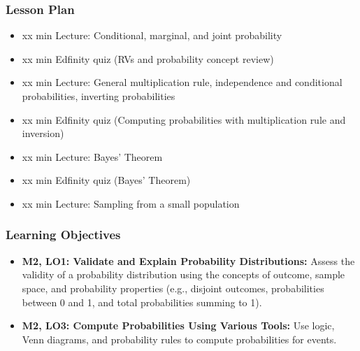 \begin{frame}
    \frametitle{Lesson Plan}
    \begin{itemize}
        \item xx min Lecture: Conditional, marginal, and joint probability
        \item xx min Edfinity quiz (RVs and probability concept review)
        \item xx min Lecture: General multiplication rule, independence and conditional probabilities, inverting probabilities
        \item xx min Edfinity quiz (Computing probabilities with multiplication rule and inversion)
        \item xx min Lecture: Bayes' Theorem
        \item xx min Edfinity quiz (Bayes' Theorem)
        \item xx min Lecture: Sampling from a small population
    \end{itemize}
\end{frame}

\begin{frame}
    \frametitle{Learning Objectives}
    \begin{itemize}
        \item \textbf{M2, LO1: Validate and Explain Probability Distributions:} Assess the validity of a probability distribution using the concepts of outcome, sample space, and probability properties (e.g., disjoint outcomes, probabilities between 0 and 1, and total probabilities summing to 1).
        \item \textbf{M2, LO3: Compute Probabilities Using Various Tools:} Use logic, Venn diagrams, and probability rules to compute probabilities for events.
    \end{itemize}
\end{frame}

